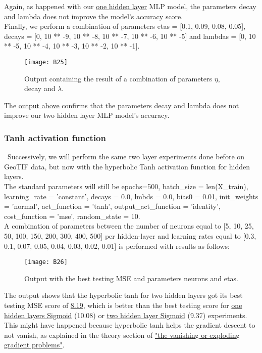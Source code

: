 Again, as happened with our \hyperref[fig:B9]{one hidden layer} MLP model, the parameters decay and lambda does not improve the model's accuracy score.\\

Finally, we perform a combination of parameters etas = [0.1, 0.09, 0.08, 0.05], decays = [0, 10 ** -9, 10 ** -8, 10 ** -7, 10 ** -6, 10 ** -5] and lambdas = [0, 10 ** -5, 10 ** -4, 10 ** -3, 10 ** -2, 10 ** -1].

\begin{figure}[H]
\label{fig:B17}
\centering
\texttt{[image: B25]}
\caption{Output containing the result of a combination of parameters $\eta$, decay and $\lambda$.}
\end{figure}

The \hyperref[fig:B17]{output above} confirms that the parameters decay and lambda does not improve our two hidden layer MLP model's accuracy.

\subsubsection{Tanh activation function}
\label{chap:Tanh activation function}

\quad \, Successively, we will perform the same two layer experiments done before on GeoTIF data, but now with the hyperbolic Tanh activation function for hidden layers.\\

The standard parameters will still be epochs=500, batch\_size = len(X\_train), learning\_rate = 'constant', decays = 0.0, lmbds = 0.0, bias0 = 0.01, init\_weights = 'normal', act\_function = 'tanh', output\_act\_function = 'identity', cost\_function = 'mse', random\_state = 10.\\

A combination of parameters between the number of neurons equal to [5, 10, 25, 50, 100, 150, 200, 300, 400, 500] per hidden-layer and learning rates equal to [0.3, 0.1, 0.07, 0.05, 0.04, 0.03, 0.02, 0.01] is performed with results as follows:

\begin{figure}[H]
\label{fig:B18}
\centering
\texttt{[image: B26]}
\caption{Output with the best testing MSE and parameters neurons and etas.}
\end{figure}

The output shows that the hyperbolic tanh for two hidden layers got its best testing MSE score of \hyperref[fig:B18]{8.19}, which is better than the best testing score for \hyperref[fig:B1]{one hidden layers Sigmoid} (10.08) or \hyperref[fig:B10]{two hidden layer Sigmoid} (9.37) experiments. This might have happened because hyperbolic tanh helps the gradient descent to not vanish, as explained in the theory section of \hyperref[chap:The vanishing or exploding gradient problems]{"the vanishing or exploding gradient problems"}.


